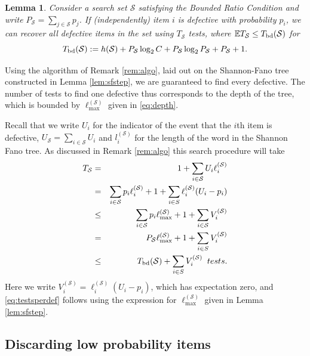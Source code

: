 \documentclass[conference]{IEEEtran}
\newcounter{eqn}
\newtheorem{lemma}[theorem]{Lemma}
\newcommand{\ep}{{\mathbb{E}}}
\newcommand{\setS}{{\mathcal{S}}}
\newcommand{\bd}{{\rm bd}}
\begin{document}
\begin{lemma} \label{lem:expset}
 Consider a search set $\setS$ satisfying the Bounded Ratio Condition  and write $P_{\setS} = \sum_{j \in \setS} p_j$.
If (independently) item $i$ is defective with probability $p_i$, 
we can recover  all defective items in the set using $T_\setS$ tests, where $\ep T_\setS \leq T_{\bd}(\setS)$ for
\begin{equation} \label{eq:tbds}
 T_{\bd}(\setS) :=  h(\setS) +  P_{\setS} \log_2 C +  P_{\setS} \log_2 P_{\setS} + P_\setS + 1. \end{equation}
\end{lemma}
\begin{IEEEproof}
Using the algorithm of Remark \ref{rem:algo}, laid out on the Shannon-Fano tree constructed in Lemma \ref{lem:sfstep}, we are guaranteed  to find every defective.
The number of tests to find one defective thus corresponds to the depth of the tree, which is bounded by  $\ell_{\max}^{(\setS)}$ given in \eqref{eq:depth}.

Recall that we write $U_i$ for the indicator of the event that the $i$th item is defective, $U_{\setS} = \sum_{i \in \setS} U_i$ and 
$l_i^{(\setS)}$ for the length of the word in the Shannon Fano tree. As discussed in Remark \ref{rem:algo}
this search procedure will take 
\begin{eqnarray}
T_\setS & = &  1 + \sum_{i \in \setS} U_i \ell_i^{(\setS)} \nonumber \\
& = &  \sum_{i \in \setS} p_i \ell_i^{(\setS)} + 1 + \sum_{i \in S} \ell_i^{(\setS)} (U_i - p_i)  \nonumber \\
& \leq & \sum_{i \in \setS} p_i \ell_{\max}^{(\setS)} +  1 + \sum_{i \in \setS} V_i^{(\setS)}  \nonumber \\
& =  &  P_{\setS} \ell_{\max}^{(\setS)} +  1 + \sum_{i \in S} V_i^{(\setS)} \nonumber \\
& \leq  & T_{\bd}(\setS) + \sum_{i \in S} V_i^{(\setS)} 
\mbox{ \;\; tests.} \label{eq:testsperdef} \end{eqnarray}
Here we write $V_ i^{(\setS)} = \ell_i^{(\setS)} (U_i - p_i)$, which has expectation zero, and \eqref{eq:testsperdef} follows using the expression for 
$\ell_{\max}^{(\setS)}$ given in   Lemma \ref{lem:sfstep}.
\end{IEEEproof}

\subsection{Discarding low probability items} \label{sec:discard}
\end{document}
